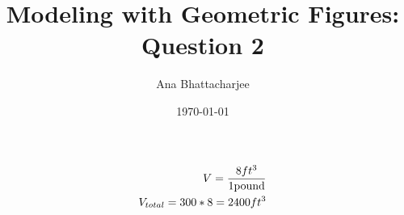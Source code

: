 \documentclass{article}
\begin{document}
\title{Modeling with Geometric Figures: Question 2}
\author{Ana Bhattacharjee}
\date{\today}
\maketitle

\begin{align}
  V = \frac{8 ft^3}{1 \vspace{1cm}\text{pound}} \\ 
  V_{total} = 300 * 8 = 2400 ft^3
\end{align}
\end{document}
